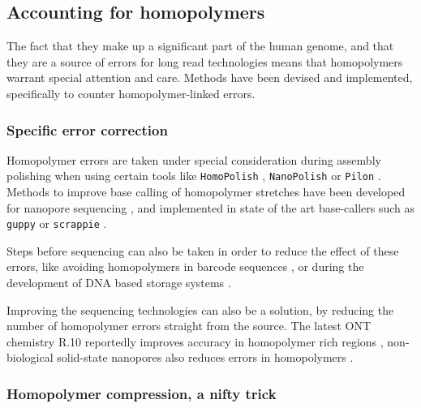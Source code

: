 \documentclass[
  11pt,
  twoside,
  BCOR=10mm,
  listof=totoc]{scrbook}
\begin{document}
\hypertarget{accounting-for-homopolymers}{%
\subsection{Accounting for homopolymers}\label{accounting-for-homopolymers}}

The fact that they make up a significant part of the human genome, and that they are a source of errors for long read technologies means that homopolymers warrant special attention and care. Methods have been devised and implemented, specifically to counter homopolymer-linked errors.

\hypertarget{specific-error-correction}{%
\subsubsection{Specific error correction}\label{specific-error-correction}}

Homopolymer errors are taken under special consideration during assembly polishing when using certain tools like \texttt{HomoPolish} \autocite{huangHomopolishMethodRemoval2021}, \texttt{NanoPolish} \autocite{simpsonDetectingDNACytosine2017} or \texttt{Pilon} \autocite{walkerPilonIntegratedTool2014}. Methods to improve base calling of homopolymer stretches have been developed for nanopore sequencing \autocite{rangSquiggleBasepairComputational2018,sarkozyCallingHomopolymerStretches2018}, and implemented in state of the art base-callers such as \texttt{guppy} or \texttt{scrappie} \autocite{wickPerformanceNeuralNetwork2019}.

Steps before sequencing can also be taken in order to reduce the effect of these errors, like avoiding homopolymers in barcode sequences \autocite{hawkinsIndelcorrectingDNABarcodes2018,srivathsanMinIONBasedPipeline2018}, or during the development of DNA based storage systems \autocite{wangConstructionBioConstrainedCode2019}.

Improving the sequencing technologies can also be a solution, by reducing the number of homopolymer errors straight from the source. The latest ONT chemistry R.10 reportedly improves accuracy in homopolymer rich regions \autocite{R10NewestNanopore,amarasingheOpportunitiesChallengesLongread2020}, non-biological solid-state nanopores also reduces errors in homopolymers \autocite{zhouDetectionDNAHomopolymer2019,gotoIdentificationFourSinglestranded2018}.

\hypertarget{hpc-trick}{%
\subsubsection{Homopolymer compression, a nifty trick}\label{hpc-trick}}
\end{document}
